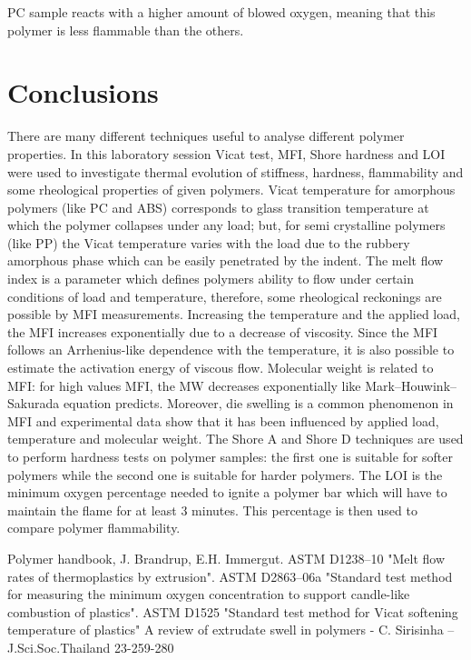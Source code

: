 \documentclass[a4paper, 11pt]{article}
\begin{document}
PC sample reacts with a higher amount of blowed oxygen, meaning that this polymer is less flammable than the others.
 
\section{Conclusions}

There are many different techniques useful to analyse different polymer properties. In this laboratory session Vicat test, MFI, Shore hardness and LOI were used to investigate thermal evolution of stiffness, hardness, flammability and some rheological properties of given polymers.
Vicat temperature for amorphous polymers (like PC and ABS) corresponds to glass transition temperature at which the polymer collapses under any load; but, for semi crystalline polymers (like PP) the Vicat temperature varies with the load due to the rubbery amorphous phase which can be easily penetrated by the indent.
The melt flow index is a parameter which defines polymers ability to flow under certain conditions of load and temperature, therefore, some rheological reckonings are possible by MFI measurements. Increasing the temperature and the applied load, the MFI increases exponentially due to a decrease of viscosity. Since the MFI follows an Arrhenius-like dependence with the temperature, it is also possible to estimate the activation energy of viscous flow. Molecular weight is related to MFI: for high values MFI, the MW decreases exponentially like Mark–Houwink–Sakurada equation predicts. Moreover, die swelling is a common phenomenon in MFI and experimental data show that it has been influenced by applied load, temperature and molecular weight.
The Shore A and Shore D techniques are used to perform hardness tests on polymer samples: the first one is suitable for softer polymers while the second one is suitable for harder polymers.
The LOI is the minimum oxygen percentage needed to ignite a polymer bar which will have to maintain the flame for at least 3 minutes. This percentage is then used to compare polymer flammability.

\newpage

\thispagestyle{empty}

\begin{thebibliography}{1}

 Polymer handbook, J. Brandrup, E.H. Immergut.
 ASTM D1238–10 "Melt flow rates of thermoplastics by extrusion". 
 ASTM D2863–06a "Standard test method for measuring the minimum oxygen concentration to support candle-like combustion of plastics".
 ASTM D1525 "Standard test method for Vicat softening temperature of plastics"
 A review of extrudate swell in polymers - C. Sirisinha – J.Sci.Soc.Thailand 23-259-280

\end{thebibliography}
\end{document}
